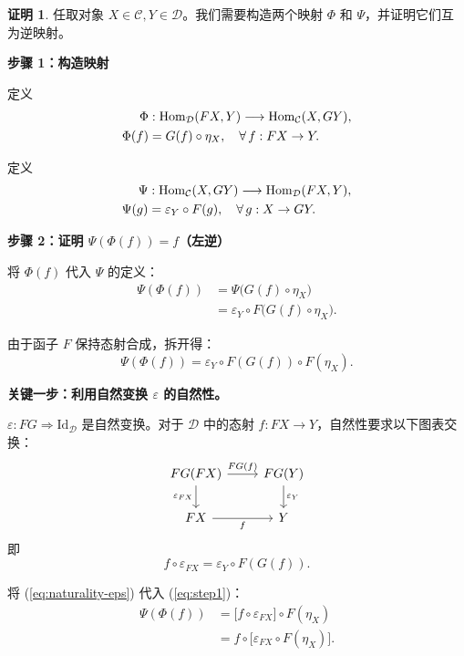 \documentclass[12pt,a4paper]{ctexart}
\theoremstyle{definition}
\newtheorem*{proof*}{证明}
\newcommand{\Hom}{\mathrm{Hom}}
\newcommand{\Id}{\mathrm{Id}}
\begin{document}
\begin{proof*}
任取对象 $X \in \mathcal{C}, Y \in \mathcal{D}$。我们需要构造两个映射 $\Phi$ 和 $\Psi$，并证明它们互为逆映射。

\medskip
\noindent\textbf{步骤 1：构造映射}

定义
\begin{align}
\Phi &: \Hom_{\mathcal{D}}(FX, Y) \longrightarrow \Hom_{\mathcal{C}}(X, GY), \notag\\
\Phi(f) &= G(f) \circ \eta_X, \quad \forall\, f: FX \to Y. \label{eq:Phi}
\end{align}

定义
\begin{align}
\Psi &: \Hom_{\mathcal{C}}(X, GY) \longrightarrow \Hom_{\mathcal{D}}(FX, Y), \notag\\
\Psi(g) &= \varepsilon_Y \circ F(g), \quad \forall\, g: X \to GY. \label{eq:Psi}
\end{align}

\medskip
\noindent\textbf{步骤 2：证明 $\Psi(\Phi(f)) = f$（左逆）}

将 $\Phi(f)$ 代入 $\Psi$ 的定义：
\begin{align*}
\Psi(\Phi(f)) &= \Psi\big(G(f) \circ \eta_X\big) \\
&= \varepsilon_Y \circ F\big(G(f) \circ \eta_X\big).
\end{align*}

由于函子 $F$ 保持态射合成，拆开得：
\begin{equation}\label{eq:step1}
\Psi(\Phi(f)) = \varepsilon_Y \circ F(G(f)) \circ F(\eta_X).
\end{equation}

\textbf{关键一步：利用自然变换 $\varepsilon$ 的自然性。}

$\varepsilon: FG \Rightarrow \Id_{\mathcal{D}}$ 是自然变换。对于 $\mathcal{D}$ 中的态射 $f: FX \to Y$，自然性要求以下图表交换：
\[
\begin{tikzcd}
FG(FX) \ar[r, "FG(f)"] \ar[d, "\varepsilon_{FX}"'] & FG(Y) \ar[d, "\varepsilon_Y"] \\
FX \ar[r, "f"'] & Y
\end{tikzcd}
\]
即
\begin{equation}\label{eq:naturality-eps}
f \circ \varepsilon_{FX} = \varepsilon_Y \circ F(G(f)).
\end{equation}

将 (\ref{eq:naturality-eps}) 代入 (\ref{eq:step1})：
\begin{align*}
\Psi(\Phi(f)) &= \big[f \circ \varepsilon_{FX}\big] \circ F(\eta_X) \\
&= f \circ \big[\varepsilon_{FX} \circ F(\eta_X)\big].
\end{align*}


\end{proof*}
\end{document}
